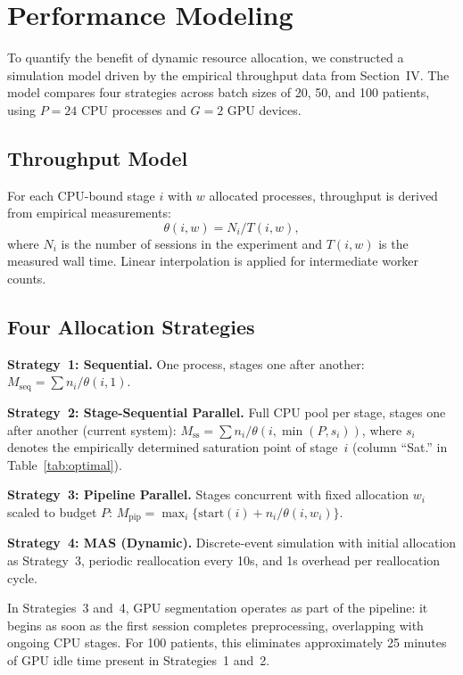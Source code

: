 \documentclass[conference]{IEEEtran}
\begin{document}
\section{Performance Modeling}

To quantify the benefit of dynamic resource allocation, we constructed a simulation model driven by the empirical throughput data from Section~IV. The model compares four strategies across batch sizes of 20, 50, and 100 patients, using $P = 24$ CPU processes and $G = 2$ GPU devices.

\subsection{Throughput Model}

For each CPU-bound stage $i$ with $w$ allocated processes, throughput is derived from empirical measurements:
\begin{equation}
\theta(i, w) = N_i / T(i, w),
\end{equation}
where $N_i$ is the number of sessions in the experiment and $T(i, w)$ is the measured wall time. Linear interpolation is applied for intermediate worker counts.

\subsection{Four Allocation Strategies}

\textbf{Strategy~1: Sequential.} One process, stages one after another: $M_{\text{seq}} = \sum n_i / \theta(i, 1)$.

\textbf{Strategy~2: Stage-Sequential Parallel.} Full CPU pool per stage, stages one after another (current system): $M_{\text{ss}} = \sum n_i / \theta(i, \min(P, s_i))$, where $s_i$ denotes the empirically determined saturation point of stage~$i$ (column ``Sat.'' in Table~\ref{tab:optimal}).

\textbf{Strategy~3: Pipeline Parallel.} Stages concurrent with fixed allocation $w_i$ scaled to budget $P$: $M_{\text{pip}} = \max_i \{ \text{start}(i) + n_i / \theta(i, w_i) \}$.

\textbf{Strategy~4: MAS (Dynamic).} Discrete-event simulation with initial allocation as Strategy~3, periodic reallocation every 10s, and 1s overhead per reallocation cycle.

In Strategies~3 and~4, GPU segmentation operates as part of the pipeline: it begins as soon as the first session completes preprocessing, overlapping with ongoing CPU stages. For 100 patients, this eliminates approximately 25 minutes of GPU idle time present in Strategies~1 and~2.
\end{document}
